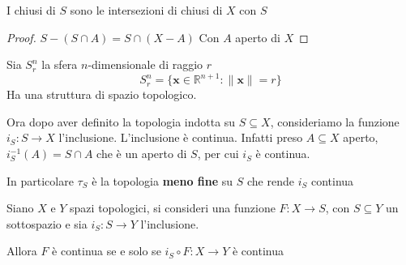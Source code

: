 \begin{proposition}
    I chiusi di \(S\) sono le intersezioni di chiusi di \(X\) con \(S\) 
\end{proposition}
\begin{proof}
    \(S - (S \cap A) = S \cap  (X - A)\) 
    Con \(A\) aperto di \(X\) 
\end{proof}
\begin{example}
    Sia \(S_r^{n}\) la sfera \(n\)-dimensionale  di raggio \(r\) 
    \[
        S_r^{n} = \{\mathbf{x} \in \mathbb{R}^{n+1} : \|\mathbf{x}\| = r\}   
    \]
    Ha una struttura di spazio topologico.
\end{example}

Ora dopo aver definito la topologia indotta su \(S \subseteq X\), consideriamo
la funzione \(i_S : S \to  X\) l'inclusione. L'inclusione è continua. Infatti
preso \(A \subseteq  X\) aperto, \(i_S^{-1}(A) = S \cap  A\) che è un aperto
di \(S\), per cui \(i_S\) è continua.

In particolare \(\tau_S\) è la topologia \textbf{meno fine} su \(S\) che rende
\(i_S\) continua

\begin{proposition}
    Siano \(X\) e \(Y\) spazi topologici, si consideri una funzione \(F : X \to
    S\), con \(S \subseteq Y \) un sottospazio e sia \(i_S : S \to Y\) l'inclusione.

    Allora \(F\) è continua se e solo se \(i_S \circ F : X \to  Y\) è continua
\end{proposition}

